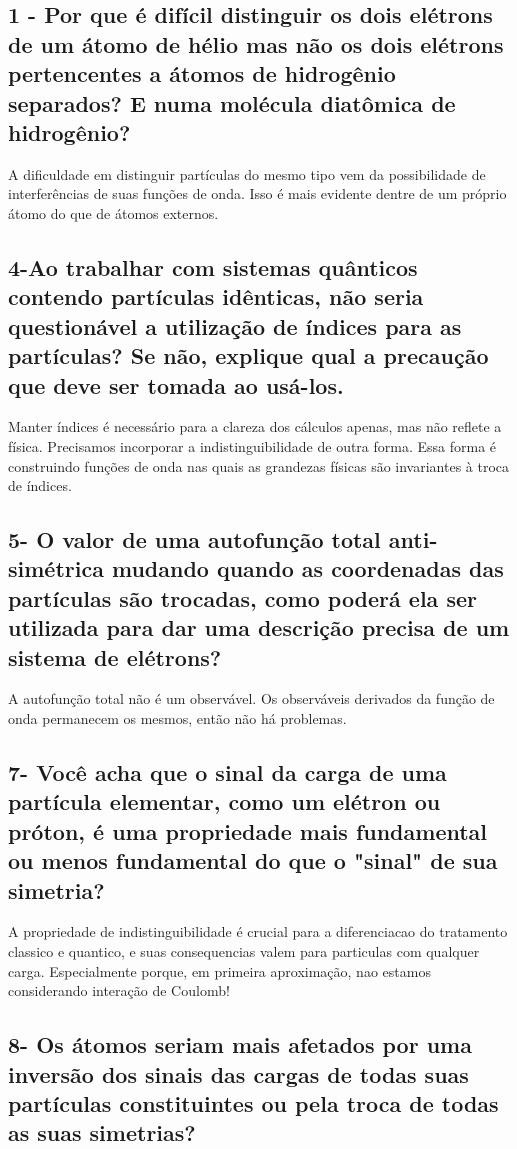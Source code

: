 \documentclass{article}
\begin{document}
\subsection{1 - Por que é difícil distinguir os dois elétrons de um átomo de hélio mas não os dois elétrons pertencentes a átomos de hidrogênio separados? E numa molécula diatômica de hidrogênio?
}
A dificuldade em distinguir partículas do mesmo tipo vem da possibilidade de interferências de suas funções de onda. Isso é mais evidente dentre de um próprio átomo do que de átomos externos.

\subsection{4-Ao trabalhar com sistemas quânticos contendo partículas idênticas, não seria questionável a utilização de índices para as partículas? Se não, explique qual a precaução que deve ser tomada ao usá-los.
}
Manter índices é necessário para a clareza dos cálculos apenas, mas não reflete a física. Precisamos incorporar a indistinguibilidade de outra forma. Essa forma é construindo funções de onda nas quais as grandezas físicas são invariantes à troca de índices.

\subsection{5- O valor de uma autofunção total anti-simétrica mudando quando as coordenadas das partículas são trocadas, como poderá ela ser utilizada para dar uma descrição precisa de um sistema de elétrons?
}
A autofunção total não é um observável. Os observáveis derivados da função de onda permanecem os mesmos, então não há problemas.

\subsection{7- Você acha que o sinal da carga de uma partícula elementar, como um elétron ou próton, é uma propriedade mais fundamental ou menos fundamental do que o "sinal" de sua simetria?
}

A propriedade de indistinguibilidade é crucial para a diferenciacao do tratamento classico e quantico, e suas consequencias valem para particulas com qualquer carga. Especialmente porque, em primeira aproximação, nao estamos considerando interação de Coulomb!

\subsection{8- Os átomos seriam mais afetados por uma inversão dos sinais das cargas de todas suas partículas constituintes ou pela troca de todas as suas simetrias?}
\end{document}
